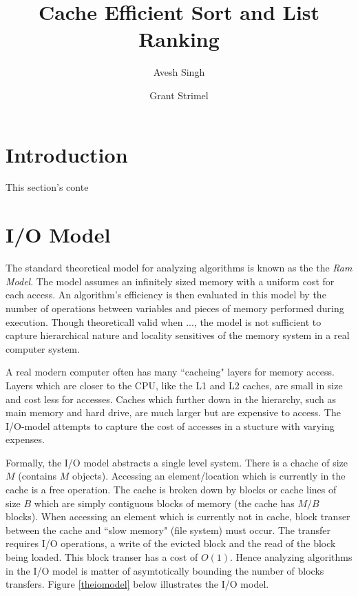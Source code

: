 \documentclass[11pt]{article}
\begin{document}
\title{\Large \bf Cache Efficient Sort and List Ranking}
\author{Avesh Singh \and Grant Strimel}

\maketitle
\section{Introduction}
This section's conte


\section{I/O Model}
The standard theoretical model for analyzing algorithms is known as the the \textit{Ram Model}.
The model assumes an infinitely sized memory with a uniform cost for each access.  An algorithm's efficiency is then 
evaluated in this model by the number of operations between variables and pieces of memory performed during execution. 
Though theoreticall valid when ..., the model is not sufficient to capture hierarchical nature and locality sensitives of the memory 
system in a real computer system.

A real modern computer often has many ``cacheing" layers for memory access.  Layers which are closer to the CPU, 
like the L1 and L2 caches, are small in size and cost less for accesses. Caches which further down in the hierarchy, such as 
main memory and hard drive, are much larger but are expensive to access.  The I/O-model attempts to capture the cost of accesses 
in a stucture with varying expenses.

Formally, the I/O model abstracts a single level system.  There is a chache of size $M$ (contains $M$ objects).  
Accessing an element/location which is currently in the cache is a free operation.  The cache is broken down by blocks or 
cache lines of size $B$ which are simply contiguous blocks of memory (the cache has $M/B$ blocks).  
When accessing an element which is currently not in 
cache, block transer between the cache and ``slow memory" (file system)  must occur.  The transfer requires I/O operations, 
a write of the evicted block and the read of the block being loaded.  This block transer has a cost of $O(1)$.  Hence 
analyzing algorithms in the I/O model is matter of asymtotically bounding the number of blocks transfers.  
Figure \ref{theiomodel} below illustrates the I/O model.
\end{document}
